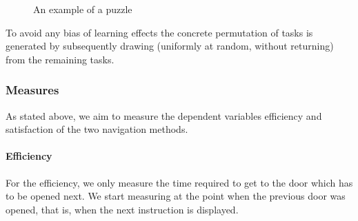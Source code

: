 \documentclass{sig-alternate-05-2015}
\begin{document}
\begin{figure}
\caption{An example of a puzzle}
\end{figure}

To avoid any bias of learning effects
the concrete permutation of tasks is generated by subsequently drawing
(uniformly at random, without returning) from the remaining tasks.

\subsubsection{Measures}
As stated above, we aim to measure the dependent variables efficiency and satisfaction of the two navigation methods. 
\paragraph{Efficiency} For the efficiency, we only measure the time required to get to the door which has to be opened next. We start measuring at the point
when the previous door was opened, that is, when the next instruction is displayed.
\end{document}
